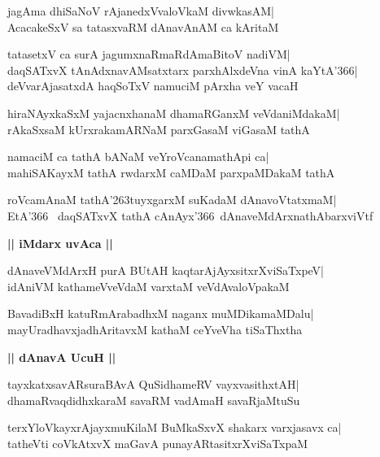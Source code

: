 \documentclass[twoside,12pt,openright]{book}
\def\S{\char'263}
\newcounter{shloka}[chapter]
\def\uvaca#1{\centerline{{\large\textbf{#1}}}}
\begin{document}
\begin{shloka}%
jagAma dhiSaNoV rAjanedxVvaloVkaM divwkasAM|\\
AcacakeSxV sa tatasxvaRM dAnavAnAM ca kAritaM
\end{shloka}

\begin{shloka}%
tatasetxV ca surA jagumxnaRmaRdAmaBitoV nadiVM|\\
daqSATxvX tAnAdxnavAMsatxtarx parxhAlxdeVna vinA kaYtA\char'366|\\
deVvarAjasatxdA haqSoTxV namuciM pArxha veY vacaH
\end{shloka}

\begin{shloka}%
hiraNAyxkaSxM yajacnxhanaM dhamaRGanxM veVdaniMdakaM|\\
rAkaSxsaM kUrxrakamARNaM parxGasaM viGasaM tathA
\end{shloka}

\begin{shloka}%
namaciM ca tathA bANaM veYroVcanamathApi ca|\\
mahiSAKayxM tathA rwdarxM caMDaM parxpaMDakaM tathA
\end{shloka}

\begin{shloka}%
roVcamAnaM tathA\S tuyxgarxM suKadaM dAnavoVtatxmaM|\\
EtA\char'366 \ daqSATxvX tathA cAnAyx\char'366\ dAnaveMdArxnathAbarxviVtf
\end{shloka}

\uvaca{|| iMdarx uvAca ||}
\begin{shloka}%
dAnaveVMdArxH purA BUtAH kaqtarAjAyxsitxrXviSaTxpeV|\\
idAniVM kathameVveVdaM varxtaM veVdAvaloVpakaM
\end{shloka}

\begin{shloka}%
BavadiBxH katuRmArabadhxM naganx muMDikamaMDalu|\\
mayUradhavxjadhAritavxM kathaM ceYveVha tiSaThxtha
\end{shloka}

\uvaca{|| dAnavA UcuH ||}
\begin{shloka}%
tayxkatxsavARsuraBAvA QuSidhameRV vayxvasithxtAH|\\
dhamaRvaqdidhxkaraM savaRM vadAmaH savaRjaMtuSu
\end{shloka}

\begin{shloka}%
terxYloVkayxrAjayxmuKilaM BuMkaSxvX shakarx varxjasavx ca|\\
tatheVti coVkAtxvX maGavA punayARtasitxrXviSaTxpaM
\end{shloka}
\end{document}
